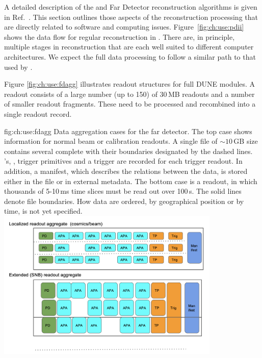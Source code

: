 \documentclass[../main-v1.tex]{subfiles}
\begin{document}
A detailed description of the  and Far Detector reconstruction algorithms is given in Ref.~\cite{DUNE:2020ypp}.  This section outlines those aspects of the reconstruction processing that are directly related to software and computing issues.
Figure~\ref{fig:ch:use:pdii} shows the data flow for regular reconstruction in .  
There are, in principle,  multiple stages in reconstruction that are each well suited to different computer architectures.  We expect the full  data processing to follow a similar path to that used by .  

Figure \ref{fig:ch:use:fdagg} illustrates  readout structures for full DUNE  modules.  A readout consists of a large number (up to 150) of   30\,MB  readouts and a number of smaller readout fragments.  These need to be processed and  recombined into a single readout record. 

\begin{dunefigure}
{fig:ch:use:fdagg}
{Data aggregation cases for the far detector. The top case shows information for normal beam or calibration readouts. A single file of $\sim 10$\,GB size contains several complete  with their boundaries designated by the dashed lines.   's, ,  trigger primitives and a trigger  are recorded for each trigger readout.  In addition, a manifest, which describes the relations between the data, is stored either in the file or in external metadata.  The bottom case is a  readout, in which thousands of 5-10\,ms time slices must be read out over 100\,s.  The solid lines denote file boundaries. How data are ordered, by geographical position or by time,    is not  yet specified.}
\includegraphics[width=0.8\textwidth]{graphics/IntroFigures/DataAggregation.png}
\end{dunefigure}
\end{document}

